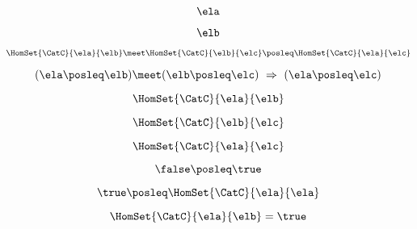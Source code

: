 {\begin{forslides}
        \begin{equation}
            \label{eq:slides_enrichment_10}
            \ela
        \end{equation}

        \begin{equation}
            \label{eq:slides_enrichment_11}
            \elb
        \end{equation}

        \begin{equation}
            \label{eq:slides_enrichment_12}
            \HomSet{\CatC}{\ela}{\elb} \meet \HomSet{\CatC}{\elb}{\elc} \posleq \HomSet{\CatC}{\ela}{\elc}
        \end{equation}

        \begin{equation}
            \label{eq:slides_enrichment_13}
            (\ela \posleq \elb) \meet (\elb \posleq \elc) \ \Rightarrow \ (\ela \posleq \elc)
        \end{equation}

        \begin{equation}
            \label{eq:slides_enrichment_14}
            \HomSet{\CatC}{\ela}{\elb}
        \end{equation}

        \begin{equation}
            \label{eq:slides_enrichment_15}
            \HomSet{\CatC}{\elb}{\elc}
        \end{equation}

        \begin{equation}
            \label{eq:slides_enrichment_16}
            \HomSet{\CatC}{\ela}{\elc}
        \end{equation}

        \begin{equation}
            \label{eq:slides_enrichment_17}
            \false \posleq \true
        \end{equation}

        \begin{equation}
            \label{eq:slides_enrichment_18}
            \true \posleq \HomSet{\CatC}{\ela}{\ela}
        \end{equation}

        \begin{equation}
            \label{eq:slides_enrichment_19}
            \HomSet{\CatC}{\ela}{\elb} = \true
        \end{equation}


\end{forslides}}
